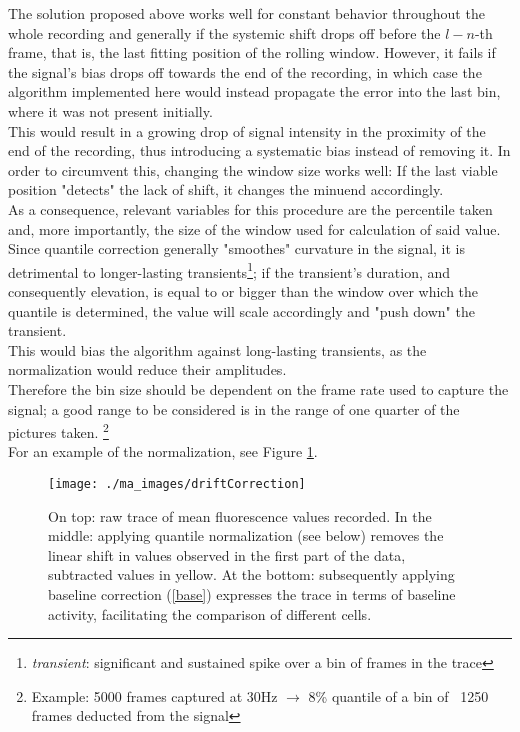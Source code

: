 \documentclass[titlepage]{article}
\begin{document}
The solution proposed above works well for constant behavior throughout the whole recording and generally if the systemic shift drops off before the $l-n$-th frame, that is, the last fitting position of the rolling window. However, it fails if the signal's bias drops off towards the end of the recording, in which case the algorithm implemented here would instead propagate the error into the last bin, where it was not present initially.\\
This would result in a growing drop of signal intensity in the proximity of the end of the recording, thus introducing a systematic bias instead of removing it.
In order to circumvent this, changing the window size works well: If the last viable position "detects" the lack of shift, it changes the minuend accordingly.\\
As a consequence, relevant variables for this procedure are the percentile taken and, more importantly, the size of the window used for calculation of said value.\\
Since quantile correction generally "smoothes" curvature in the signal, it is detrimental to longer-lasting transients\footnote{\emph{transient}: significant and sustained spike over a bin of frames in the trace}; if the transient's duration, and consequently elevation, is equal to or bigger than the window over which the quantile is determined, the value will scale accordingly and "push down" the transient.\\
This would bias the algorithm against long-lasting transients, as the normalization would reduce their amplitudes.\\
Therefore the bin size should be dependent on the frame rate used to capture the signal; a good range to be considered is in the range of one quarter of the pictures taken. \footnote{Example: 5000 frames captured at 30Hz $\rightarrow$ 8\% quantile of a bin of ~1250 frames deducted from the signal}\\
For an example of the normalization, see Figure \ref{fig:driftCorrection}.
\begin{figure}[H]
\centering
\texttt{[image: ./ma\_images/driftCorrection]}
\caption{On top: raw trace of mean fluorescence values recorded. In the middle: applying quantile normalization (see below) removes the linear shift in values observed in the first part of the data, subtracted values in yellow. At the bottom: subsequently applying baseline correction (\ref{base}) expresses the trace in terms of baseline activity, facilitating the comparison of different cells.}
\label{fig:driftCorrection}
\end{figure}
\end{document}
